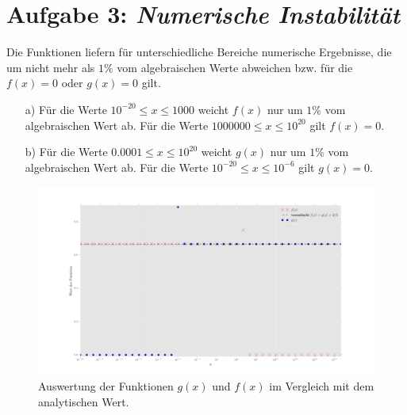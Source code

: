 \section{Aufgabe 3: \emph{Numerische Instabilität}}

Die Funktionen liefern für unterschiedliche Bereiche numerische Ergebnisse, die um nicht mehr als $1\%$ vom algebraischen Werte abweichen bzw. für die $f(x)=0$ oder $g(x)=0$ gilt.

\begin{itemize}

\item[a)] Für die Werte $10^{-20}\leq x \leq 1000$ weicht $f(x)$ nur um $1\%$ vom algebraischen Wert ab.\newline\newline
Für die Werte $1000000\leq x \leq 10^{20}$ gilt $f(x)=0$.

\item[b)] Für die Werte $0.0001\leq x \leq 10^{20}$ weicht $g(x)$ nur um $1\%$ vom algebraischen Wert ab.\newline\newline
Für die Werte $10^{-20} \leq x \leq 10^{-6}$ gilt $g(x)=0$.

\end{itemize}

\begin{figure}
\centering
\includegraphics[width=\textwidth]{plot3.png}
\caption{Auswertung der Funktionen $g(x)$ und $f(x)$ im Vergleich mit dem analytischen Wert.}
\end{figure}

